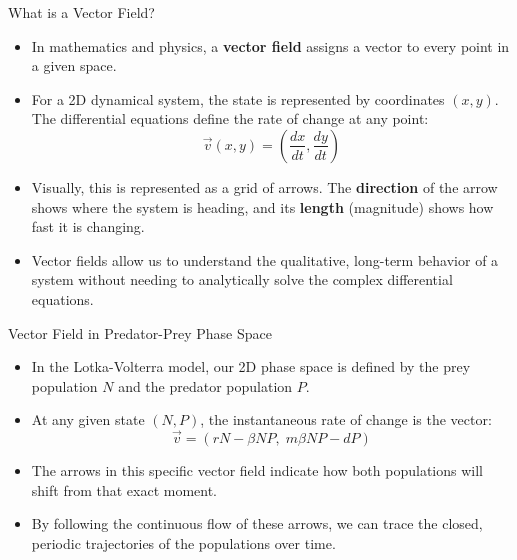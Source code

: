 \begin{frame}{What is a Vector Field?}
    \begin{itemize}
        \item In mathematics and physics, a \textbf{vector field} assigns a vector to every point in a given space. 
        \pause
        \item For a 2D dynamical system, the state is represented by coordinates $(x, y)$. The differential equations define the rate of change at any point:
        \begin{equation}
            \vec{v}(x,y) = \left( \frac{dx}{dt}, \frac{dy}{dt} \right)
        \end{equation}
        \pause
        \item Visually, this is represented as a grid of arrows. The \textbf{direction} of the arrow shows where the system is heading, and its \textbf{length} (magnitude) shows how fast it is changing.
        \item Vector fields allow us to understand the qualitative, long-term behavior of a system without needing to analytically solve the complex differential equations.
    \end{itemize}
\end{frame}

\begin{frame}{Vector Field in Predator-Prey Phase Space}
    \begin{itemize}
        \item In the Lotka-Volterra model, our 2D phase space is defined by the prey population $N$ and the predator population $P$.
        \pause
        \item At any given state $(N, P)$, the instantaneous rate of change is the vector:
        \begin{equation}
            \vec{v} = \left( rN - \beta NP, \; m\beta NP - dP \right)
        \end{equation}
        \pause
        \item The arrows in this specific vector field indicate how both populations will shift from that exact moment.
        \item By following the continuous flow of these arrows, we can trace the closed, periodic trajectories of the populations over time.
    \end{itemize}
\end{frame}

